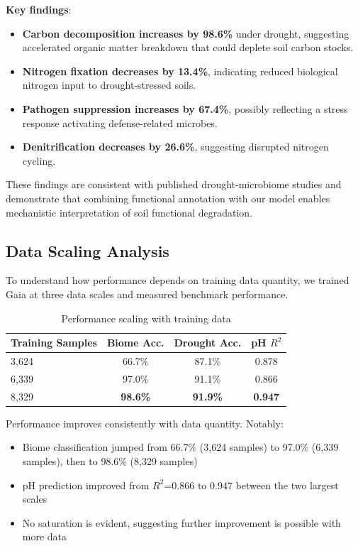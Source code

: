 \documentclass[11pt,a4paper]{article}
\begin{document}
\textbf{Key findings}:
\begin{itemize}[leftmargin=1.5em]
    \item \textbf{Carbon decomposition increases by 98.6\%} under drought, suggesting accelerated organic matter breakdown that could deplete soil carbon stocks.
    \item \textbf{Nitrogen fixation decreases by 13.4\%}, indicating reduced biological nitrogen input to drought-stressed soils.
    \item \textbf{Pathogen suppression increases by 67.4\%}, possibly reflecting a stress response activating defense-related microbes.
    \item \textbf{Denitrification decreases by 26.6\%}, suggesting disrupted nitrogen cycling.
\end{itemize}

These findings are consistent with published drought-microbiome studies and demonstrate that combining functional annotation with our model enables mechanistic interpretation of soil functional degradation.

\subsection{Data Scaling Analysis}

To understand how performance depends on training data quantity, we trained Gaia at three data scales and measured benchmark performance.

\begin{table}[H]
\centering
\caption{Performance scaling with training data}
\label{tab:scaling}
\begin{tabular}{lccc}
\toprule
\textbf{Training Samples} & \textbf{Biome Acc.} & \textbf{Drought Acc.} & \textbf{pH $R^2$} \\
\midrule
3,624 & 66.7\% & 87.1\% & 0.878 \\
6,339 & 97.0\% & 91.1\% & 0.866 \\
8,329 & \textbf{98.6\%} & \textbf{91.9\%} & \textbf{0.947} \\
\bottomrule
\end{tabular}
\end{table}

Performance improves consistently with data quantity. Notably:
\begin{itemize}[leftmargin=1.5em]
    \item Biome classification jumped from 66.7\% (3,624 samples) to 97.0\% (6,339 samples), then to 98.6\% (8,329 samples)
    \item pH prediction improved from $R^2$=0.866 to 0.947 between the two largest scales
    \item No saturation is evident, suggesting further improvement is possible with more data
\end{itemize}
\end{document}
